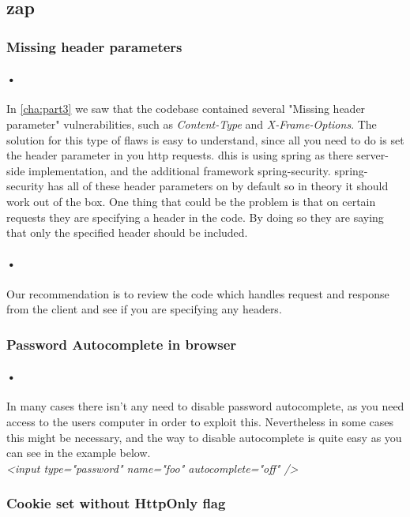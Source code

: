 \documentclass[11pt,english,a4paper]{report}
\begin{document}
\subsection{\gls{zap}}

\subsubsection{Missing header parameters}
\paragraph{•}

In \ref{cha:part3} we saw that the codebase contained several "Missing header parameter" vulnerabilities, such as \textit{Content-Type} and 
\textit{X-Frame-Options}.
The solution for this type of flaws is easy to understand, since all you need to do is set the header parameter in you \gls{http} requests.
\gls{dhis} is using \gls{spring} as there server-side implementation, and the additional framework \gls{spring}-security.
\gls{spring}-security has all of these header parameters on by default so in theory it should work out of the box.
One thing that could be the problem is that on certain requests they are specifying a header in the code.
By doing so they are saying that only the specified header should be included.
\paragraph{•}
Our recommendation is to review the code which handles request and response from the client and see if you are specifying any headers.

\subsubsection{Password Autocomplete in browser}
\paragraph{•}
In many cases there isn't any need to disable password autocomplete, as you need access to the users computer in order to exploit this.
Nevertheless in some cases this might be necessary, and the way to disable autocomplete is quite easy as you can see in the example below.
\\
\textit{ \textless input type="password" name="foo" autocomplete="off" /\textgreater}

\subsubsection{Cookie set without HttpOnly flag}
\end{document}
